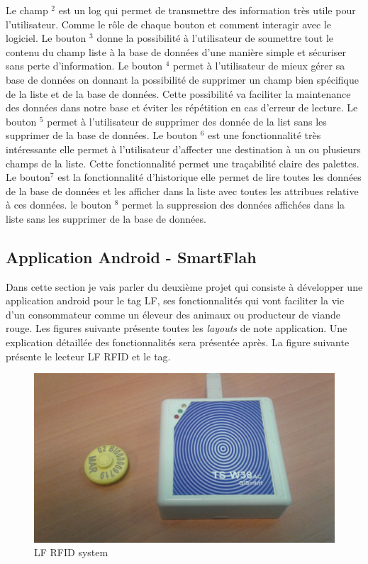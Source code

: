 \documentclass[11pt, a4paper, twoside]{book}
\begin{document}
Le champ \(^{2}\) est un log qui permet de transmettre des information très utile pour l'utilisateur. Comme le rôle de chaque bouton et comment interagir avec le logiciel. Le bouton \(^{3}\) donne la possibilité à l'utilisateur de soumettre tout le contenu du champ liste à la base de données d'une manière simple et sécuriser sans perte d'information. Le bouton \(^{4}\) permet à l'utilisateur de mieux gérer sa base de données on donnant la possibilité de supprimer un champ bien spécifique de la liste et de la base de données. Cette possibilité va faciliter la maintenance des données dans notre base et éviter les répétition en cas d'erreur de lecture. Le bouton \(^{5}\) permet à l'utilisateur de supprimer des donnée de la list sans les supprimer de la base de données. Le bouton \(^{6}\) est une fonctionnalité très intéressante elle permet à l'utilisateur d'affecter une destination à un ou plusieurs champs de la liste. Cette fonctionnalité permet une traçabilité claire des palettes. Le bouton\(^{7}\) est la fonctionnalité d'historique elle permet de lire toutes les données de la base de données et les afficher dans la liste avec toutes les attribues relative à ces données.
le bouton \(^{8}\) permet la suppression des données affichées dans la liste sans les supprimer de la base de données.

\subsection{Application Android - SmartFlah}
Dans cette section je vais parler du deuxième projet qui consiste à développer une application android pour le tag LF, ses fonctionnalités qui vont faciliter la vie d'un consommateur comme un éleveur des animaux ou producteur de viande rouge. Les figures suivante présente toutes les \emph{layouts} de note application. Une explication détaillée des fonctionnalités sera présentée après. La figure suivante présente le lecteur LF RFID et le tag.

\begin{figure}[H]
\centering
\includegraphics[width=\textwidth]{lfreader}
\caption{LF RFID system}
\end{figure}
\end{document}
